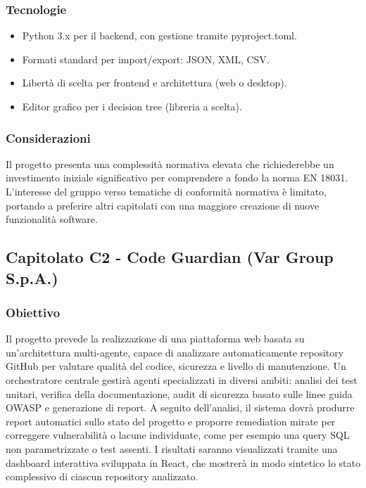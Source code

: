 \documentclass[a4paper, 10pt, colorlinks=true, linkcolor=black, urlcolor=blue, citecolor=blue, hidelinks]{article}
\begin{document}
\subsubsection{Tecnologie}
\begin{itemize}
    \item Python 3.x per il backend, con gestione tramite pyproject.toml.
    \item Formati standard per import/export: JSON, XML, CSV.
    \item Libertà di scelta per frontend e architettura (web o desktop).
    \item Editor grafico per i decision tree (libreria a scelta).
\end{itemize}

\subsubsection{Considerazioni}
Il progetto presenta una complessità normativa elevata che richiederebbe un investimento iniziale significativo per comprendere a fondo la norma EN 18031. L’interesse del gruppo verso tematiche di conformità normativa è limitato, portando a preferire altri capitolati con una maggiore creazione di nuove funzionalità software.
\subsection{Capitolato C2 - Code Guardian (Var Group S.p.A.)}

\subsubsection{Obiettivo}
Il progetto prevede la realizzazione di una piattaforma web basata su un’architettura multi-agente, capace di analizzare automaticamente repository GitHub per valutare qualità del codice, sicurezza e livello di manutenzione. Un orchestratore centrale gestirà agenti specializzati in diversi ambiti: analisi dei test unitari, verifica della documentazione, audit di sicurezza basato sulle linee guida OWASP e generazione di report. A seguito dell’analisi, il sistema dovrà produrre report automatici sullo stato del progetto e proporre remediation mirate per correggere vulnerabilità o lacune individuate, come per esempio una query SQL non parametrizzate o test assenti. I risultati saranno visualizzati tramite una dashboard interattiva sviluppata in React, che mostrerà in modo sintetico lo stato complessivo di ciascun repository analizzato.
\end{document}
